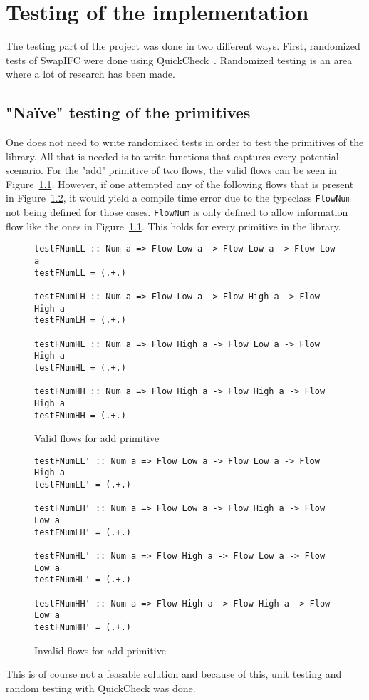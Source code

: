 \chapter{Testing of the implementation}
\label{chapter:testing}
The testing part of the project was done in two different ways. First, randomized tests of SwapIFC were done using QuickCheck~\cite{quickcheck, quickcheck-wiki}. Randomized testing is an area where a lot of research has been made.
\section{"Naïve" testing of the primitives}
One does not need to write randomized tests in order to test the primitives of the library. All that is needed is to write functions that captures every potential scenario. For the "add" primitive of two flows, the valid flows can be seen in Figure~\ref{fig:validFlow}.
However, if one attempted any of the following flows that is present in Figure~\ref{fig:invalidFlow}, it would yield a compile time error due to the typeclass {\tt FlowNum} not being defined for those cases. {\tt FlowNum} is only defined to allow information flow like the ones in Figure~\ref{fig:validFlow}. This holds for every primitive in the library.
\begin{figure}[h]
\begin{verbatim}
testFNumLL :: Num a => Flow Low a -> Flow Low a -> Flow Low a
testFNumLL = (.+.)
  
testFNumLH :: Num a => Flow Low a -> Flow High a -> Flow High a
testFNumLH = (.+.)
    
testFNumHL :: Num a => Flow High a -> Flow Low a -> Flow High a
testFNumHL = (.+.)
    
testFNumHH :: Num a => Flow High a -> Flow High a -> Flow High a
testFNumHH = (.+.)
\end{verbatim}
\caption{Valid flows for add primitive}
\label{fig:validFlow}
\end{figure}
\begin{figure}[h]
\begin{verbatim}
testFNumLL' :: Num a => Flow Low a -> Flow Low a -> Flow High a
testFNumLL' = (.+.)
  
testFNumLH' :: Num a => Flow Low a -> Flow High a -> Flow Low a
testFNumLH' = (.+.)

testFNumHL' :: Num a => Flow High a -> Flow Low a -> Flow Low a
testFNumHL' = (.+.)

testFNumHH' :: Num a => Flow High a -> Flow High a -> Flow Low a
testFNumHH' = (.+.)
\end{verbatim}
\caption{Invalid flows for add primitive}
\label{fig:invalidFlow}
\end{figure}
This is of course not a feasable solution and because of this, unit testing and random testing with QuickCheck was done.


